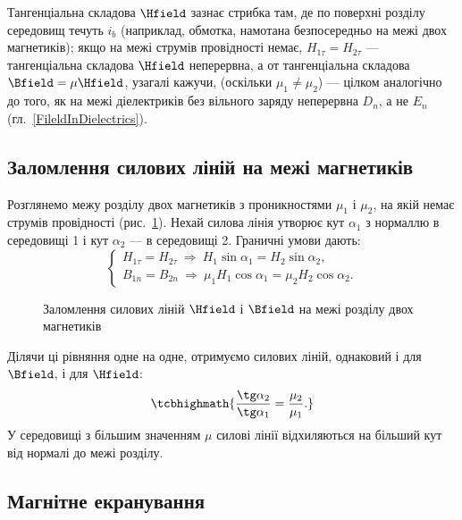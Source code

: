 \begin{Attention}
	Тангенціальна складова $\Hfield$ зазнає стрибка  там, де по поверхні розділу середовищ течуть  $i_b$
	(наприклад, обмотка, намотана безпосередньо на межі двох магнетиків); якщо на межі струмів провідності немає, $H_{1\tau}=H_{2\tau}$ ---
	тангенціальна складова $\Hfield$ неперервна, а от тангенціальна складова $\Bfield = \mu\Hfield$, узагалі кажучи,  (оскільки
	$\mu_1\neq\mu_2$) --- цілком аналогічно до того, як на межі діелектриків без вільного заряду неперервна $D_n$, а не $E_n$
	(гл.~\ref{FileldInDielectrics}).
\end{Attention}

\subsection*{Заломлення силових ліній на межі магнетиків}

Розглянемо межу розділу двох магнетиків з проникностями $\mu_1$ і $\mu_2$, на якій немає струмів провідності (рис.~\ref{pic:Refraction}). Нехай
силова лінія утворює кут $\alpha_1$ з нормаллю в середовищі 1 і кут $\alpha_2$ --- в середовищі 2. Граничні умови дають:
\begin{equation*}
	\begin{cases}
		H_{1\tau}=H_{2\tau} \ \Rightarrow\ H_1\sin\alpha_1 = H_2\sin\alpha_2, \\
		B_{1n}=B_{2n} \ \Rightarrow\ \mu_1H_1\cos\alpha_1 = \mu_2H_2\cos\alpha_2.
	\end{cases}
\end{equation*}

\begin{figure}[h!]\centering
	\caption{Заломлення силових ліній $\Hfield$ і $\Bfield$ на межі розділу двох
		магнетиків\label{pic:Refraction}}
\end{figure}

Ділячи ці рівняння одне на одне, отримуємо  силових ліній, однаковий і для $\Bfield$, і для $\Hfield$:
\begin{equation}\label{eq:RefractionLaw}
	\tcbhighmath{
		\frac{\tg\alpha_2}{\tg\alpha_1} = \frac{\mu_2}{\mu_1}.
	}
\end{equation}
У середовищі з більшим значенням $\mu$ силові лінії відхиляються на більший кут від нормалі до межі розділу.

\subsection*{Магнітне екранування}

